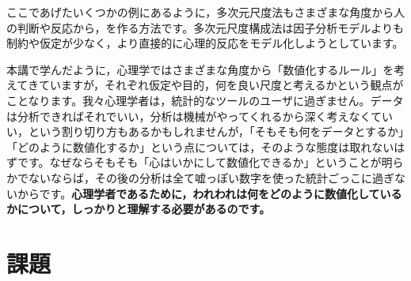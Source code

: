 \documentclass{ltjsbook}
\begin{document}
ここであげたいくつかの例にあるように，多次元尺度法もさまざまな角度から人の判断や反応から，を作る方法です。多次元尺度構成法は因子分析モデルよりも制約や仮定が少なく，より直接的に心理的反応をモデル化しようとしています。

本講で学んだように，心理学ではさまざまな角度から「数値化するルール」を考えてきていますが，それぞれ仮定や目的，何を良い尺度と考えるかという観点がことなります。我々心理学者は，統計的なツールのユーザに過ぎません。データは分析できればそれでいい，分析は機械がやってくれるから深く考えなくていい，という割り切り方もあるかもしれませんが，「そもそも何をデータとするか」「どのように数値化するか」という点については，そのような態度は取れないはずです。なぜならそもそも「心はいかにして数値化できるか」ということが明らかでないならば，その後の分析は全て嘘っぽい数字を使った統計ごっこに過ぎないからです。\textbf{心理学者であるために，われわれは何をどのように数値化しているかについて，しっかりと理解する必要があるのです。}

\section{課題}
\end{document}
